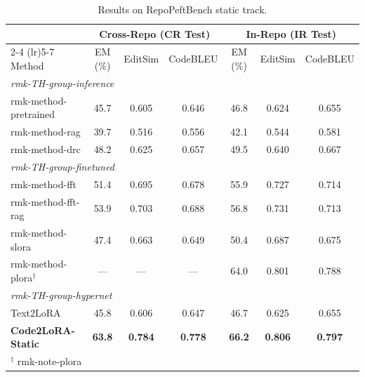 \documentclass{llmxive}
\providecommand{\UseMacro}[1]{\csname rmk-#1\endcsname}
\providecommand{\codelora}{Code2LoRA\xspace}
\providecommand{\repopeftbench}{RepoPeftBench\xspace}
\providecommand{\codelorastatic}{\codelora-Static\xspace}
\providecommand{\textlora}{Text2LoRA\xspace}
\begin{document}
\begin{table}[t]
\begin{small}
\begin{center}
\begin{tabular}{l@{\hskip 8pt}ccc@{\hskip 12pt}ccc}
\toprule
& \multicolumn{3}{c}{\textbf{Cross-Repo (CR Test)}} & \multicolumn{3}{c}{\textbf{In-Repo (IR Test)}} \\
\cmidrule(lr){2-4} \cmidrule(lr){5-7}
Method & EM (\%) & EditSim & CodeBLEU & EM (\%) & EditSim & CodeBLEU \\
\midrule
\multicolumn{7}{l}{\emph{\UseMacro{TH-group-inference}}} \\
\midrule
\UseMacro{method-pretrained} & 45.7 & 0.605 & 0.646 & 46.8 & 0.624 & 0.655 \\
\UseMacro{method-rag} & 39.7 & 0.516 & 0.556 & 42.1 & 0.544 & 0.581 \\
\UseMacro{method-drc} & 48.2 & 0.625 & 0.657 & 49.5 & 0.640 & 0.667 \\
\midrule
\multicolumn{7}{l}{\emph{\UseMacro{TH-group-finetuned}}} \\
\midrule
\UseMacro{method-fft} & 51.4 & 0.695 & 0.678 & 55.9 & 0.727 & 0.714 \\
\UseMacro{method-fft-rag} & 53.9 & 0.703 & 0.688 & 56.8 & 0.731 & 0.713 \\
\UseMacro{method-slora} & 47.4 & 0.663 & 0.649 & 50.4 & 0.687 & 0.675 \\
\UseMacro{method-plora}$^\dag$ & --- & --- & --- & 64.0 & 0.801 & 0.788 \\
\midrule
\multicolumn{7}{l}{\emph{\UseMacro{TH-group-hypernet}}} \\
\midrule
\textlora{} & 45.8 & 0.606 & 0.647 & 46.7 & 0.625 & 0.655 \\
\textbf{\codelorastatic{}} & \textbf{63.8} & \textbf{0.784} & \textbf{0.778} & \textbf{66.2} & \textbf{0.806} & \textbf{0.797} \\
\bottomrule
\multicolumn{7}{l}{\footnotesize $^\dag$ \UseMacro{note-plora}} \\
\end{tabular}


\end{center}
\end{small}
\caption{Results on \repopeftbench{} static track.}
\label{tab:main_results}
\end{table}
\end{document}
